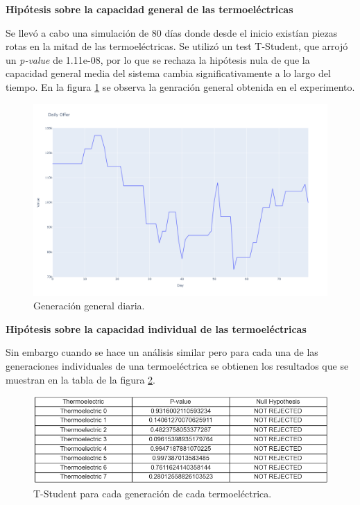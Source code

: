 \documentclass[twocolumn, fontsize=10pt]{article}
\begin{document}
\textbf{Hipótesis sobre la capacidad general de las termoeléctricas}

Se llevó a cabo una simulación de 80 días donde desde el inicio existían piezas rotas en la mitad de las termoeléctricas.
Se utilizó un test T-Student, que arrojó un \textit{p-value} de 1.11e-08, por 
lo que se rechaza la hipótesis nula de que la capacidad general media del sistema cambia significativamente a lo largo del tiempo.
En la figura \ref{fig:daily_offer} se observa la genración general obtenida en el experimento.

\begin{figure}[H]
  \centering
  \includegraphics[width=\columnwidth]{assets/daily_offer.png}
  \caption{Generación general diaria.}
  \label{fig:daily_offer}
  \end{figure}


\textbf{Hipótesis sobre la capacidad individual de las termoeléctricas}

Sin embargo cuando se hace un análisis similar pero para cada una de las generaciones individuales de una termoeléctrica se obtienen los resultados que se muestran en la tabla de la figura \ref{fig:table}.


\begin{figure}[H]
  \centering
  \includegraphics[width=\columnwidth]{assets/table.png}
  \caption{T-Student para cada generación de cada termoeléctrica.}
  \label{fig:table}
  \end{figure}
\end{document}
